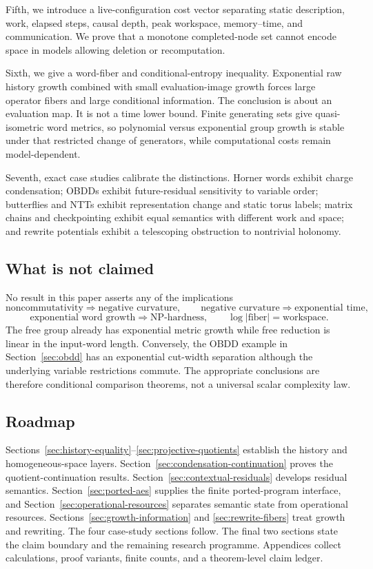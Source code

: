 Fifth, we introduce a live-configuration cost vector separating static
description, work, elapsed steps, causal depth, peak workspace, memory--time,
and communication.  We prove that a monotone completed-node set cannot encode
space in models allowing deletion or recomputation.

Sixth, we give a word-fiber and conditional-entropy inequality.  Exponential
raw history growth combined with small evaluation-image growth forces large
operator fibers and large conditional information.  The conclusion is about
an evaluation map.  It is not a time lower bound.  Finite generating sets give
quasi-isometric word metrics, so polynomial versus exponential group growth is
stable under that restricted change of generators, while computational costs
remain model-dependent.

Seventh, exact case studies calibrate the distinctions.  Horner words exhibit
charge condensation; OBDDs exhibit future-residual sensitivity to variable
order; butterflies and NTTs exhibit representation change and static torus
labels; matrix chains and checkpointing exhibit equal semantics with different
work and space; and rewrite potentials exhibit a telescoping obstruction to
nontrivial holonomy.

\subsection{What is not claimed}

No result in this paper asserts any of the implications
\[
  \text{noncommutativity}\Longrightarrow\text{negative curvature},
  \qquad
  \text{negative curvature}\Longrightarrow\text{exponential time},
\]
\[
  \text{exponential word growth}\Longrightarrow\text{NP-hardness},
  \qquad
  \log|\text{fiber}|=\text{workspace}.
\]
The free group already has exponential metric growth while free reduction is
linear in the input-word length.  Conversely, the OBDD example in
Section~\ref{sec:obdd} has an exponential cut-width separation although the
underlying variable restrictions commute.  The appropriate conclusions are
therefore conditional comparison theorems, not a universal scalar complexity
law.

\subsection{Roadmap}

Sections~\ref{sec:history-equality}--\ref{sec:projective-quotients} establish
the history and homogeneous-space layers.  Section~\ref{sec:condensation-continuation}
proves the quotient-continuation results.  Section~\ref{sec:contextual-residuals}
develops residual semantics.  Section~\ref{sec:ported-aes} supplies the finite
ported-program interface, and Section~\ref{sec:operational-resources}
separates semantic state from operational resources.  Sections~\ref{sec:growth-information}
and \ref{sec:rewrite-fibers} treat growth and rewriting.  The four case-study
sections follow.  The final two sections state the claim boundary and the
remaining research programme.  Appendices collect calculations, proof variants,
finite counts, and a theorem-level claim ledger.

